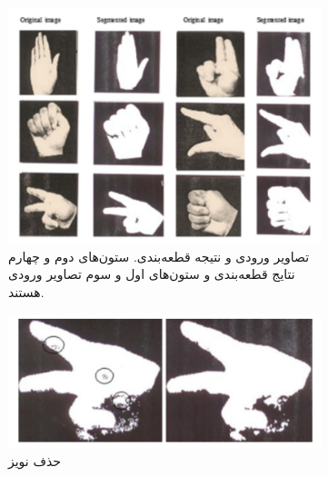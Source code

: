 \documentclass[11.5pt,a4paper]{article}
\begin{document}
\begin{figure}[h]
\center
	\begin{subfigure}{.3\textwidth}
		\includegraphics[scale=0.4]{Imgs/hsann1.png}
		\caption{تصاویر ورودی و نتیجه قطعه‌بندی. ستون‌های دوم و چهارم نتایج قطعه‌بندی و ستون‌های اول و سوم تصاویر ورودی هستند.}
	\end{subfigure}
	\begin{subfigure}{.4\textwidth}
		\includegraphics[scale=0.4]{Imgs/hsannn2.png}
		\caption{ حذف نویز}
	\end{subfigure}
	\\
	\begin{subfigure}{.3\textwidth}

\end{subfigure}
\end{figure}
\end{document}
